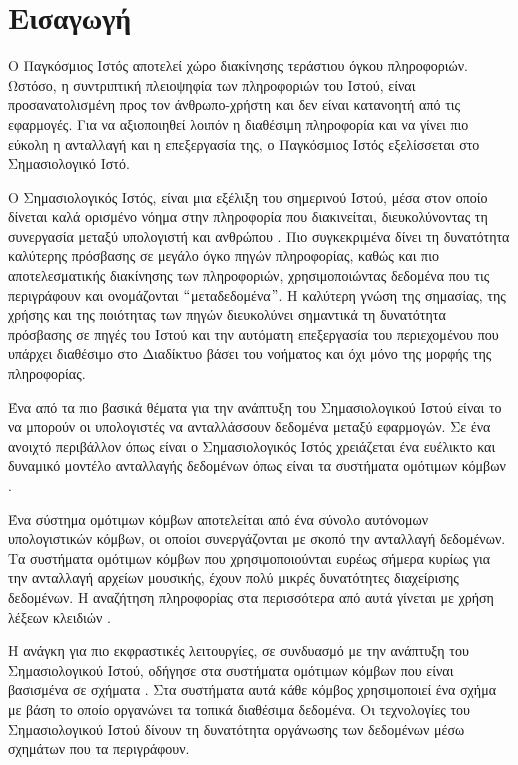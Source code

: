 \chapter{Εισαγωγή}

Ο Παγκόσμιος Ιστός αποτελεί χώρο διακίνησης τεράστιου όγκου
πληροφοριών. Ωστόσο, η συντριπτική πλειοψηφία των πληροφοριών του
Ιστού, είναι προσανατολισμένη προς τον άνθρωπο-χρήστη και δεν
είναι κατανοητή από τις εφαρμογές. Για να αξιοποιηθεί λοιπόν η
διαθέσιμη πληροφορία και να γίνει πιο εύκολη η ανταλλαγή και η
επεξεργασία της, ο Παγκόσμιος Ιστός εξελίσσεται στο Σημασιολογικό
Ιστό.

Ο Σημασιολογικός Ιστός, είναι μια εξέλιξη του σημερινού Ιστού,
μέσα στον οποίο δίνεται καλά ορισμένο νόημα στην πληροφορία που
διακινείται, διευκολύνοντας τη συνεργασία μεταξύ υπολογιστή και
ανθρώπου \cite{Berners-Lee01}. Πιο συγκεκριμένα δίνει τη
δυνατότητα καλύτερης πρόσβασης σε μεγάλο όγκο πηγών πληροφορίας,
καθώς και πιο αποτελεσματικής διακίνησης των πληροφοριών,
χρησιμοποιώντας δεδομένα που τις περιγράφουν και ονομάζονται
$``$μεταδεδομένα$"$. Η καλύτερη γνώση της σημασίας, της χρήσης και
της ποιότητας των πηγών διευκολύνει σημαντικά τη δυνατότητα
πρόσβασης σε πηγές του Ιστού και την αυτόματη επεξεργασία του
περιεχομένου που υπάρχει διαθέσιμο στο Διαδίκτυο βάσει του
νοήματος και όχι μόνο της μορφής της πληροφορίας.

Ένα από τα πιο βασικά θέματα για την ανάπτυξη του Σημασιολογικού
Ιστού είναι το να μπορούν οι υπολογιστές να ανταλλάσσουν δεδομένα
 μεταξύ εφαρμογών. Σε ένα ανοιχτό περιβάλλον όπως
είναι ο Σημασιολογικός Ιστός χρειάζεται ένα ευέλικτο και δυναμικό
μοντέλο ανταλλαγής δεδομένων όπως είναι τα συστήματα ομότιμων
κόμβων .

Ένα σύστημα ομότιμων κόμβων αποτελείται από ένα σύνολο αυτόνομων
υπολογιστικών κόμβων, οι οποίοι συνεργάζονται με σκοπό την
ανταλλαγή δεδομένων. Τα συστήματα ομότιμων κόμβων που
χρησιμοποιούνται ευρέως σήμερα κυρίως για την ανταλλαγή αρχείων
μουσικής, έχουν πολύ μικρές δυνατότητες διαχείρισης δεδομένων. Η
αναζήτηση πληροφορίας στα περισσότερα από αυτά γίνεται με χρήση
λέξεων κλειδιών .

Η ανάγκη για πιο εκφραστικές λειτουργίες, σε συνδυασμό με την
ανάπτυξη του Σημασιολογικού Ιστού, οδήγησε στα συστήματα ομότιμων
κόμβων που είναι βασισμένα σε σχήματα . Στα συστήματα αυτά κάθε κόμβος
χρησιμοποιεί ένα σχήμα με βάση το οποίο οργανώνει τα τοπικά
διαθέσιμα δεδομένα. Οι τεχνολογίες του Σημασιολογικού Ιστού δίνουν
τη δυνατότητα οργάνωσης των δεδομένων μέσω σχημάτων που τα
περιγράφουν.

